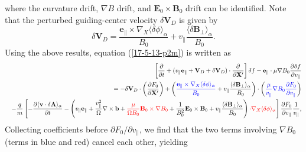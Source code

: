 \documentclass{article}
\newcommand{\tmcolor}[2]{{\color{#1}{#2}}}
\begin{document}
where the curvature drift, $\nabla B$ drift, and $\mathbf{E}_0 \times
\mathbf{B}_0$ drift can be identified. Note that the perturbed guiding-center
velocity $\delta \mathbf{V}_D$ is given by
\begin{equation}
  \delta \mathbf{V}_D = \frac{\mathbf{e}_{\parallel} \times \nabla_X \langle
  \delta \phi \rangle_{\alpha}}{B_0} + v_{\parallel} \frac{\langle \delta
  \mathbf{B}_{\perp} \rangle_{\alpha}}{B_0} .
\end{equation}
Using the above results, equation (\ref{17-5-13-p2m}) is written as
\begin{eqnarray}
  &  & \left[ \frac{\partial}{\partial t} + (v_{\parallel}
  \mathbf{e}_{\parallel} +\mathbf{V}_D + \delta \mathbf{V}_D) \cdot
  \frac{\partial}{\partial \mathbf{X}'} \right] \delta f
  -\mathbf{e}_{\parallel} \cdot \mu \nabla B_0 \frac{\partial \delta
  f}{\partial v_{\parallel}} \nonumber\\
  &  & = - \delta \mathbf{V}_D \cdot \left( \frac{\partial F_0}{\partial
  \mathbf{X}'} \right) + \left( \tmcolor{blue}{\frac{\mathbf{e}_{\parallel}
  \times \nabla_X \langle \delta \phi \rangle_{\alpha}}{B_0}} + v_{\parallel}
  \frac{\langle \delta \mathbf{B}_{\perp} \rangle_{\alpha}}{B_0} \right) \cdot
  \left( \tmcolor{blue}{\frac{\mu}{v_{\parallel}} \nabla B_0 \frac{\partial
  F_0}{\partial v_{\parallel}}} \right) \nonumber\\
  &  & - \frac{q}{m} \left[ - \frac{\partial \langle \mathbf{v} \cdot \delta
  \mathbf{A} \rangle_{\alpha}}{\partial t} - \left( v_{\parallel}
  \mathbf{e}_{\parallel} + \frac{v_{\parallel}^2}{\Omega} \nabla \times
  \mathbf{b}+ \tmcolor{red}{\frac{\mu}{\Omega B_0} \mathbf{B}_0 \times \nabla
  B_0} + \frac{1}{B_0^2} \mathbf{E}_0 \times \mathbf{B}_0 + v_{\parallel}
  \frac{\langle \delta \mathbf{B}_{\perp} \rangle_{\alpha}}{B_0} \right)
  \tmcolor{red}{\cdot \nabla_X \langle \delta \phi \rangle_{\alpha}} \right]
  \frac{\partial F_0}{\partial v_{\parallel}}  \frac{1}{v_{\parallel}}, 
\end{eqnarray}
Collecting coefficients before $\partial F_0 / \partial v_{\parallel}$, we
find that the two terms involving $\nabla B_0$ (terms in blue and red) cancel
each other, yielding
\end{document}
